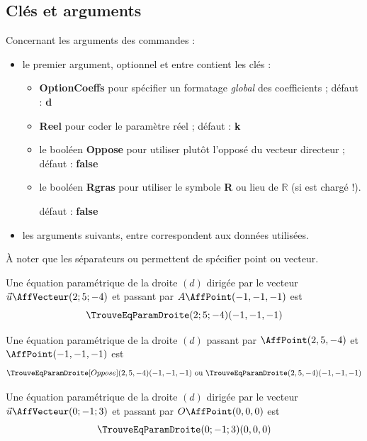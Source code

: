 \documentclass[a4paper,french,11pt]{article}
\newcommand\ctex[1]{\tcbox[vignettelatex]{#1}}
\newcommand\Cle[1]{{\bfseries\sffamily\textlangle #1\textrangle}}
\begin{document}
\subsection{Clés et arguments}

\begin{cautionblock}
Concernant les arguments des commandes :

\begin{itemize}
	\item le premier argument, optionnel et entre \ctex{[...]}  contient les clés :
	\begin{itemize}
		\item \Cle{OptionCoeffs} pour spécifier un formatage \textit{global} des coefficients ; \hfill{}défaut : \Cle{d}
		\item \Cle{Reel} pour coder le paramètre réel ; \hfill{}défaut : \Cle{k}
		\item le booléen \Cle{Oppose} pour utiliser plutôt l'opposé du vecteur directeur ; \hfill{}défaut : \Cle{false}
		\item le booléen \Cle{Rgras} pour utiliser le symbole \textbf{R} ou lieu de $\mathbb{R}$ (si \ctex{amsfonts} est chargé !).
		
		\hfill{}défaut : \Cle{false}
	\end{itemize}
	\item les arguments suivants, entre \ctex{(...)} correspondent aux données utilisées.
\end{itemize}

À noter que les séparateurs \ctex{,} ou \ctex{;} permettent de spécifier point ou vecteur.
\end{cautionblock}

\begin{PresCodePL}{}
Une équation paramétrique de la droite $(d)$ dirigée par le vecteur $\vec{u}\AffVecteur(2;5;-4)$ et passant par $A\AffPoint(-1,-1,-1)$ est
\[ \TrouveEqParamDroite(2;5;-4)(-1,-1,-1) \]
\end{PresCodePL}

\begin{PresCodePL}{}
Une équation paramétrique de la droite $(d)$ passant par $\AffPoint(2,5,-4)$ et $\AffPoint(-1,-1,-1)$ est
\[ \TrouveEqParamDroite[Oppose](2,5,-4)(-1,-1,-1) \text{ ou } \TrouveEqParamDroite(2,5,-4)(-1,-1,-1) \]
\end{PresCodePL}

\begin{PresCodePL}{}
Une équation paramétrique de la droite $(d)$ dirigée par le vecteur $\vec{u}\AffVecteur(0;-1;3)$ et passant par $O\AffPoint(0,0,0)$ est
\[ \TrouveEqParamDroite(0;-1;3)(0,0,0) \]
\end{PresCodePL}
\end{document}

